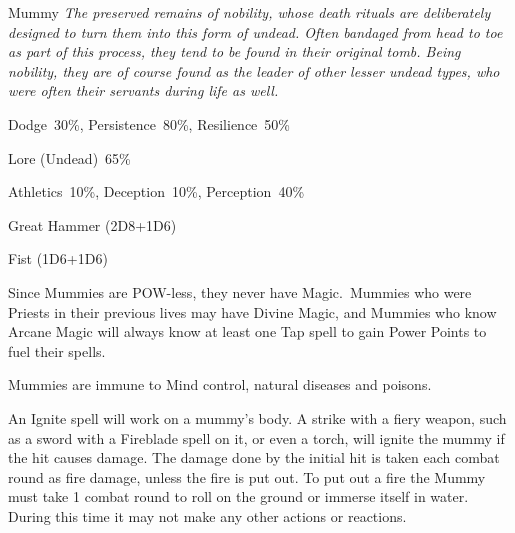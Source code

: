 \begin{monsterbox}{Mummy}
	\textit{The preserved remains of nobility, whose death rituals are deliberately designed to turn them into this form of undead. Often bandaged from head to toe as part of this process, they tend to be found in their original tomb. Being nobility, they are of course found as the leader of other lesser undead types, who were often their servants during life as well.}\\
	\rpghline
	\basics[%
        hitpoints  = 18,
	majorwound = 9,
	damagemodifier = +1D6,
	powerpoints = 0,
	movementrate = 15m,
	armor = Tough Skin (2AP),
	plunderrating = 4
	]
	\rpghline%
	\stats[ %
		STR = 3D6+12 (23),
		CON = 3D6+12 (23),
		DEX = 2D6    (4),
		SIZ = 2D6+6  (13),
		INT = 2D6+6  (13),
		POW = 0      (0),
		CHA = 1      (1)
	]
	\rpghline%
	\begin{rpg-monsteraction}[Resistances]
		Dodge~30\%, Persistence~80\%, Resilience~50\%
	\end{rpg-monsteraction}
	\begin{rpg-monsteraction}[Knowledge]
		Lore (Undead)~65\%
	\end{rpg-monsteraction}
	\begin{rpg-monsteraction}[Practical]
		Athletics~10\%, Deception~10\%, Perception~40\%
	\end{rpg-monsteraction}
	\begin{rpg-monsteraction}
		Great Hammer (2D8+1D6)
	\end{rpg-monsteraction}
	\begin{rpg-monsteraction}
		Fist (1D6+1D6)
	\end{rpg-monsteraction}
	\begin{rpg-monsteraction}[Magic]
		Since Mummies are POW-less, they never have Magic. Mummies who were Priests in their previous lives may have Divine Magic, and Mummies who know Arcane Magic will always know at least one Tap spell to gain Power Points to fuel their spells.
	\end{rpg-monsteraction}
	\begin{rpg-monsteraction}[Immunities]
		Mummies are immune to Mind control, natural diseases and poisons.
	\end{rpg-monsteraction}
	\begin{rpg-monsteraction}[Flammable]
		An Ignite spell will work on a mummy’s body. A strike with a fiery weapon, such as a sword with a Fireblade spell on it, or even a torch, will ignite the mummy if the hit causes damage. The damage done by the initial hit is taken each combat round as fire damage, unless the fire is put out. To put out a fire the Mummy must take 1 combat round to roll on the ground or immerse itself in water. During this time it may not make any other actions or reactions.

\end{rpg-monsteraction}
\end{monsterbox}

